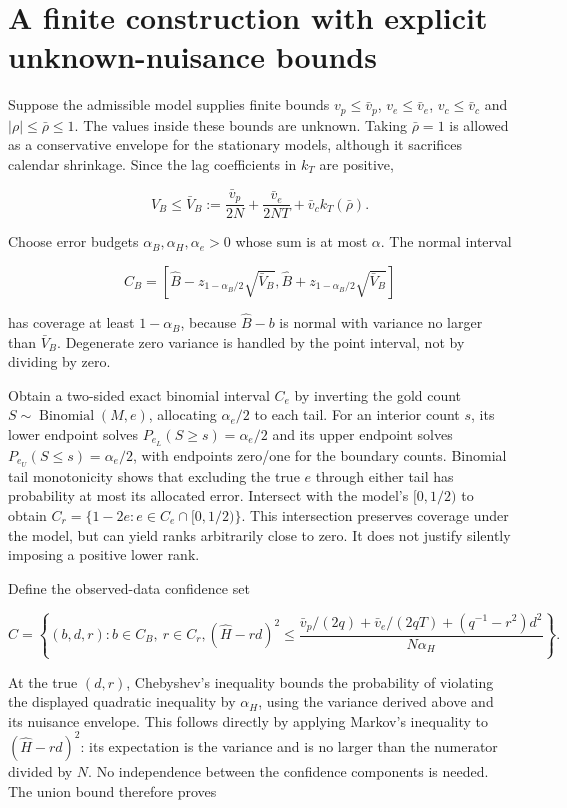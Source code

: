 \hypertarget{a-finite-construction-with-explicit-unknown-nuisance-bounds}{%
\section{A finite construction with explicit unknown-nuisance
bounds}\label{a-finite-construction-with-explicit-unknown-nuisance-bounds}}

Suppose the admissible model supplies finite bounds \(v_p\leq\bar v_p\),
\(v_e\leq\bar v_e\), \(v_c\leq\bar v_c\) and
\(|\rho|\leq\bar\rho\leq1\). The values inside these bounds are unknown.
Taking \(\bar\rho=1\) is allowed as a conservative envelope for the
stationary models, although it sacrifices calendar shrinkage. Since the
lag coefficients in \(k_T\) are positive,

\[
 V_B\leq \bar V_B:=\frac{\bar v_p}{2N}
            +\frac{\bar v_e}{2NT}+\bar v_c k_T(\bar\rho).
\]

Choose error budgets \(\alpha_B,\alpha_H,\alpha_e>0\) whose sum is at
most \(\alpha\). The normal interval

\[
 C_B=[\widehat B-z_{1-\alpha_B/2}\sqrt{\bar V_B},
      \widehat B+z_{1-\alpha_B/2}\sqrt{\bar V_B}]
\]

has coverage at least \(1-\alpha_B\), because \(\widehat B-b\) is normal
with variance no larger than \(\bar V_B\). Degenerate zero variance is
handled by the point interval, not by dividing by zero.

Obtain a two-sided exact binomial interval \(C_e\) by inverting the gold
count \(S\sim\operatorname{Binomial}(M,e)\), allocating \(\alpha_e/2\)
to each tail. For an interior count \(s\), its lower endpoint solves
\(P_{e_L}(S\geq s)=\alpha_e/2\) and its upper endpoint solves
\(P_{e_U}(S\leq s)=\alpha_e/2\), with endpoints zero/one for the
boundary counts. Binomial tail monotonicity shows that excluding the
true \(e\) through either tail has probability at most its allocated
error. Intersect with the model's \([0,1/2)\) to obtain
\(C_r=\{1-2e:e\in C_e\cap[0,1/2)\}\). This intersection preserves
coverage under the model, but can yield ranks arbitrarily close to zero.
It does not justify silently imposing a positive lower rank.

Define the observed-data confidence set

\[
 C=\left\{(b,d,r): b\in C_B,\ r\in C_r,
 (\widehat H-rd)^2\leq
 \frac{\bar v_p/(2q)+\bar v_e/(2qT)+(q^{-1}-r^2)d^2}
      {N\alpha_H}\right\}.
\]

At the true \((d,r)\), Chebyshev's inequality bounds the probability of
violating the displayed quadratic inequality by \(\alpha_H\), using the
variance derived above and its nuisance envelope. This follows directly
by applying Markov's inequality to \((\widehat H-rd)^2\): its
expectation is the variance and is no larger than the numerator divided
by \(N\). No independence between the confidence components is needed.
The union bound therefore proves

